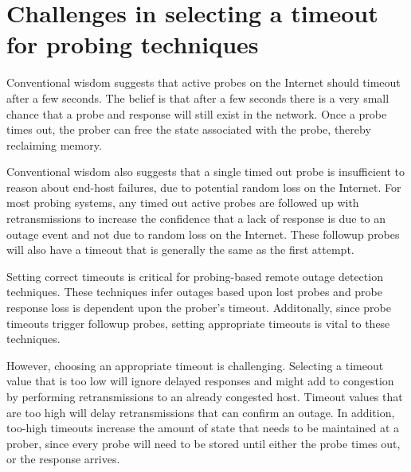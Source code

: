 \section{Challenges in selecting a timeout for probing techniques}
\label{sec:motivation}


Conventional wisdom suggests that active probes on the Internet should timeout
after a few seconds. The belief is that after a few seconds there is a very
small chance that a probe and response will still exist in the
network. Once a probe times out, the prober can free the state
associated with the probe, thereby reclaiming memory.

Conventional wisdom also suggests that a single timed out probe is
insufficient to reason about end-host failures, due to potential
random loss on the Internet. For most probing systems, any timed out
active probes are followed up with retransmissions to increase the
confidence that a lack of response is due to an outage event and not
due to random loss on the Internet. These followup probes will also
have a timeout that is generally the same as the first attempt.

Setting correct timeouts is critical for probing-based remote outage
detection techniques. These techniques infer outages based upon lost
probes and probe response loss is dependent upon the prober's
timeout. Additonally, since probe timeouts trigger followup probes,
setting appropriate timeouts is vital to these techniques.

However, choosing an appropriate timeout is
challenging. Selecting a timeout value that is too low will ignore delayed
responses and might add to congestion by performing retransmissions to an
already congested host. Timeout values that are too high will delay
retransmissions that can confirm an outage. In addition, too-high timeouts
increase the amount of state that needs to be maintained at a prober, since
every probe will need to be stored until either the probe times out,
or the response arrives.

